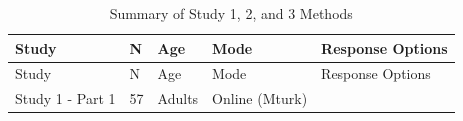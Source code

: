 \documentclass[floatsintext,man]{apa6}
\theoremstyle{definition}
\theoremstyle{definition}
\theoremstyle{definition}
\theoremstyle{remark}
\begin{document}
\begin{longtable}[]{@{}lllll@{}}
\caption{\label{tab:study3info} Summary of Study 1, 2, and 3
Methods}\tabularnewline
\toprule
\begin{minipage}[b]{0.19\columnwidth}\raggedright\strut
Study\strut
\end{minipage} & \begin{minipage}[b]{0.02\columnwidth}\raggedright\strut
N\strut
\end{minipage} & \begin{minipage}[b]{0.20\columnwidth}\raggedright\strut
Age\strut
\end{minipage} & \begin{minipage}[b]{0.11\columnwidth}\raggedright\strut
Mode\strut
\end{minipage} & \begin{minipage}[b]{0.32\columnwidth}\raggedright\strut
Response Options\strut
\end{minipage}\tabularnewline
\midrule
\endfirsthead
\toprule
\begin{minipage}[b]{0.19\columnwidth}\raggedright\strut
Study\strut
\end{minipage} & \begin{minipage}[b]{0.02\columnwidth}\raggedright\strut
N\strut
\end{minipage} & \begin{minipage}[b]{0.20\columnwidth}\raggedright\strut
Age\strut
\end{minipage} & \begin{minipage}[b]{0.11\columnwidth}\raggedright\strut
Mode\strut
\end{minipage} & \begin{minipage}[b]{0.32\columnwidth}\raggedright\strut
Response Options\strut
\end{minipage}\tabularnewline
\midrule
\endhead
\begin{minipage}[t]{0.19\columnwidth}\raggedright\strut
Study 1 - Part 1\strut
\end{minipage} & \begin{minipage}[t]{0.02\columnwidth}\raggedright\strut
57\strut
\end{minipage} & \begin{minipage}[t]{0.20\columnwidth}\raggedright\strut
Adults\strut
\end{minipage} & \begin{minipage}[t]{0.11\columnwidth}\raggedright\strut
Online (Mturk)\strut
\end{minipage} & \begin{minipage}[t]{0.32\columnwidth}\raggedright\strut

\end{minipage}
\end{longtable}
\end{document}
